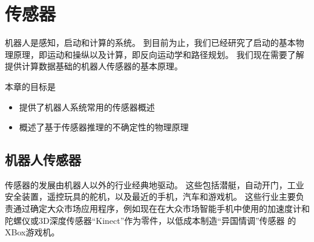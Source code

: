 \chapter{传感器}
\label{chap:sensors}

机器人是感知，启动和计算的系统。 到目前为止，我们已经研究了启动的基本物理原理，即运动和操纵以及计算，即反向运动学和路径规划。 我们现在需要了解提供计算数据基础的机器人传感器的基本原理。


本章的目标是

\begin{itemize}

\item 提供了机器人系统常用的传感器概述
\item 概述了基于传感器推理的不确定性的物理原理
\end{itemize}


\section{机器人传感器}
传感器的发展由机器人以外的行业经典地驱动。 这些包括潜艇，自动开门，工业安全装置，遥控玩具的舵机，以及最近的手机，汽车和游戏机。 这些行业主要负责通过确定大众市场应用程序，例如现在在大众市场智能手机中使用的加速度计和陀螺仪或3D深度传感器“Kinect”作为零件，以低成本制造“异国情调”传感器 的XBox游戏机。

